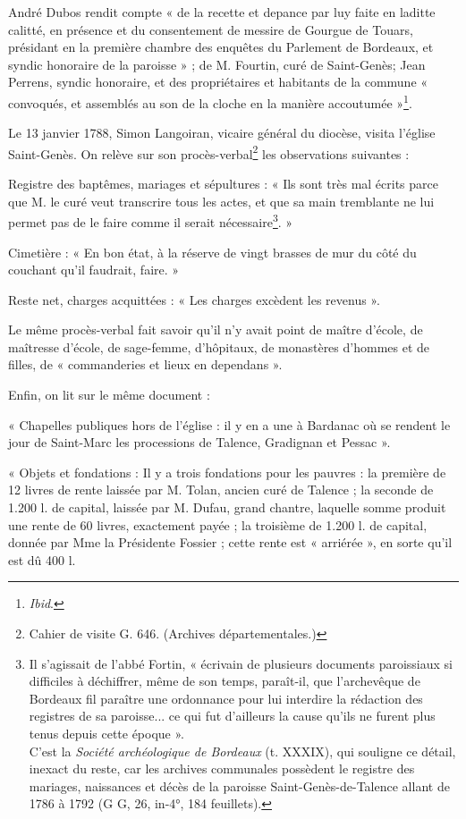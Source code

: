 \documentclass[a4paper,11pt]{book}
\begin{document}
André Dubos rendit compte « de la recette et depance par luy faite en laditte calitté, en présence et du consentement de messire de Gourgue de Touars, présidant en la première chambre des enquêtes du Parlement de Bordeaux, et syndic honoraire de la paroisse » ; de M. Fourtin, curé de Saint-Genès; Jean Perrens, syndic honoraire, et des propriétaires et habitants de la commune « convoqués, et assemblés au son de la cloche en la manière accoutumée »\footnote{\textit{Ibid}.}.

Le 13 janvier 1788, Simon Langoiran, vicaire général du diocèse, visita l'église Saint-Genès. On relève sur son procès-verbal\footnote{Cahier de visite G. 646. (Archives départementales.)} les observations suivantes :

Registre des baptêmes, mariages et sépultures : « Ils sont très mal écrits parce que M. le curé veut transcrire tous les actes, et que sa main tremblante ne lui permet pas de le faire comme il serait nécessaire\footnote{Il s'agissait de l'abbé Fortin, « écrivain de plusieurs documents paroissiaux si difficiles à déchiffrer, même de son temps, paraît-il, que l'archevêque de Bordeaux fil paraître une ordonnance pour lui interdire la rédaction des registres de sa paroisse... ce qui fut d'ailleurs la cause qu'ils ne furent plus tenus depuis cette époque ».\\C'est la \textit{Société archéologique de Bordeaux} (t. XXXIX), qui souligne ce détail, inexact du reste, car les archives communales possèdent le registre des mariages, naissances et décès de la paroisse Saint-Genès-de-Talence allant de 1786 à 1792 (G G, 26, in-4°, 184 feuillets).}. »

Cimetière : « En bon état, à la réserve de vingt brasses de mur du côté du couchant qu'il faudrait, faire. »

Reste net, charges acquittées : « Les charges excèdent les revenus ».

Le même procès-verbal fait savoir qu'il n'y avait point de maître d'école, de maîtresse d'école, de sage-femme, d'hôpitaux, de monastères d'hommes et de filles, de « commanderies et lieux en dependans ».

Enfin, on lit sur le même document :

« Chapelles publiques hors de l'église : il y en a une à Bardanac où se rendent le jour de Saint-Marc les processions de Talence, Gradignan et Pessac ».

« Objets et fondations : Il y a trois fondations pour les pauvres : la première de 12 livres de rente laissée par M. Tolan, ancien curé de Talence ; la seconde de 1.200 l. de capital, laissée par M. Dufau, grand chantre, laquelle somme produit une rente de 60 livres, exactement payée ; la troisième de 1.200 l. de capital, donnée par Mme la Présidente Fossier ; cette rente est « arriérée », en sorte qu'il est dû 400 l.
\end{document}
